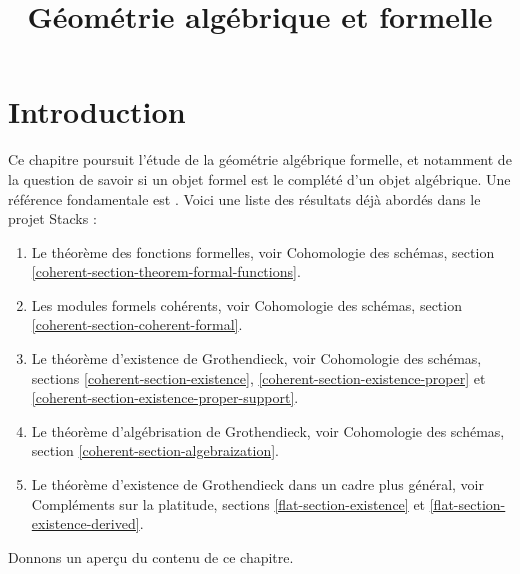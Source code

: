 

%


\title{Géométrie algébrique et formelle}


\maketitle

\label{section-phantom}

\tableofcontents

\section{Introduction}
\label{section-introduction}

\noindent
Ce chapitre poursuit l'étude de la géométrie algébrique formelle,
et notamment de la question de savoir si un objet formel est
le complété d'un objet algébrique. Une référence fondamentale est \cite{SGA2}.
Voici une liste des résultats déjà abordés
dans le projet Stacks :
\begin{enumerate}
\item Le théorème des fonctions formelles, voir
Cohomologie des schémas, section \ref{coherent-section-theorem-formal-functions}.
\item Les modules formels cohérents, voir
Cohomologie des schémas, section \ref{coherent-section-coherent-formal}.
\item Le théorème d'existence de Grothendieck, voir
Cohomologie des schémas, sections \ref{coherent-section-existence},
\ref{coherent-section-existence-proper} et
\ref{coherent-section-existence-proper-support}.
\item Le théorème d'algébrisation de Grothendieck, voir
Cohomologie des schémas, section \ref{coherent-section-algebraization}.
\item Le théorème d'existence de Grothendieck dans un cadre plus général, voir
Compléments sur la platitude, sections \ref{flat-section-existence} et
\ref{flat-section-existence-derived}.
\end{enumerate}
Donnons un aperçu du contenu de ce chapitre.

